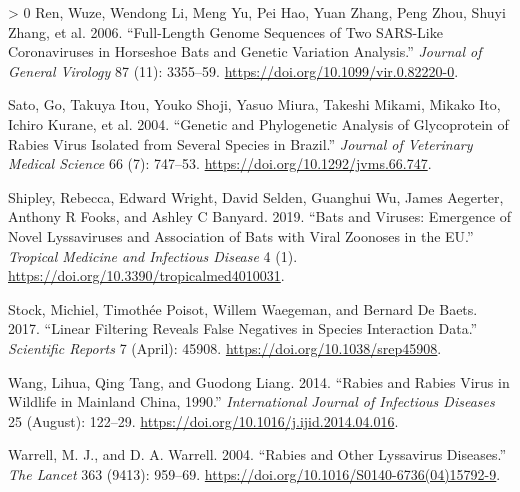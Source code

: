 \documentclass[11pt]{article}
\newlength{\cslhangindent}
\newenvironment{CSLReferences}[3] %
 {%
  \setlength{\parindent}{0pt}
  \ifodd #1 \everypar{\setlength{\hangindent}{\cslhangindent}}\ignorespaces\fi
  \ifnum #2 > 0
  \setlength{\parskip}{#2\baselineskip}
  \fi
 }%
 {}
\begin{document}
\begin{CSLReferences}{1}{0}
\leavevmode\hypertarget{ref-Ren2006FulGen}{}%
Ren, Wuze, Wendong Li, Meng Yu, Pei Hao, Yuan Zhang, Peng Zhou, Shuyi
Zhang, et al. 2006. {``Full-Length Genome Sequences of Two SARS-Like
Coronaviruses in Horseshoe Bats and Genetic Variation Analysis.''}
\emph{Journal of General Virology} 87 (11): 3355--59.
\url{https://doi.org/10.1099/vir.0.82220-0}.

\leavevmode\hypertarget{ref-Sato2004GenPhy}{}%
Sato, Go, Takuya Itou, Youko Shoji, Yasuo Miura, Takeshi Mikami, Mikako
Ito, Ichiro Kurane, et al. 2004. {``Genetic and Phylogenetic Analysis of
Glycoprotein of Rabies Virus Isolated from Several Species in Brazil.''}
\emph{Journal of Veterinary Medical Science} 66 (7): 747--53.
\url{https://doi.org/10.1292/jvms.66.747}.

\leavevmode\hypertarget{ref-Shipley2019BatVir}{}%
Shipley, Rebecca, Edward Wright, David Selden, Guanghui Wu, James
Aegerter, Anthony R Fooks, and Ashley C Banyard. 2019. {``Bats and
Viruses: Emergence of Novel Lyssaviruses and Association of Bats with
Viral Zoonoses in the EU.''} \emph{Tropical Medicine and Infectious
Disease} 4 (1). \url{https://doi.org/10.3390/tropicalmed4010031}.

\leavevmode\hypertarget{ref-Stock2017LinFil}{}%
Stock, Michiel, Timothée Poisot, Willem Waegeman, and Bernard De Baets.
2017. {``Linear Filtering Reveals False Negatives in Species Interaction
Data.''} \emph{Scientific Reports} 7 (April): 45908.
\url{https://doi.org/10.1038/srep45908}.

\leavevmode\hypertarget{ref-Wang2014RabRab}{}%
Wang, Lihua, Qing Tang, and Guodong Liang. 2014. {``Rabies and Rabies
Virus in Wildlife in Mainland China, 1990.''} \emph{International
Journal of Infectious Diseases} 25 (August): 122--29.
\url{https://doi.org/10.1016/j.ijid.2014.04.016}.

\leavevmode\hypertarget{ref-Warrell2004RabOth}{}%
Warrell, M. J., and D. A. Warrell. 2004. {``Rabies and Other Lyssavirus
Diseases.''} \emph{The Lancet} 363 (9413): 959--69.
\url{https://doi.org/10.1016/S0140-6736(04)15792-9}.

\end{CSLReferences}
\end{document}
